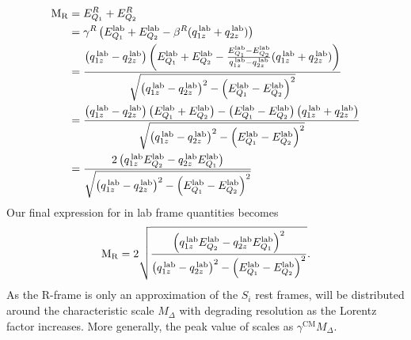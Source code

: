 \begin{align}
  \mathrm{M_R} &= E_{Q_1}^R + E_{Q_2}^R \\
      &= \gamma^R \left( E_{Q_1}^{\textrm{lab}} + E_{Q_2}^{\textrm{lab}} - \beta^R (
q_{1z}^{\,\textrm{lab}} + q_{2z}^{\,\textrm{lab}}) \right) \\
      &= \frac{\left( q_{1z}^{\,\textrm{lab}} - q_{2z}^{\,\textrm{lab}}\right) 
               \left( E_{Q_1}^{\textrm{lab}} + E_{Q_2}^{\textrm{lab}} - \frac{E_{Q_1}^{\textrm{lab}}
- E_{Q_2}^{\textrm{lab}}}{q_{1z}^{\,\textrm{lab}} - q_{2z}^{\,\textrm{lab}}}
(q_{1z}^{\,\textrm{lab}} + q_{2z}^{\,\textrm{lab}}) \right)}
              { \sqrt{ \left( q_{1z}^{\,\textrm{lab}} - q_{2z}^{\,\textrm{lab}} \right)^2 
                      -\left( E_{Q_1}^{\textrm{lab}} - E_{Q_2}^{\textrm{lab}}\right)^2 }} \\
      &= \frac{\left( q_{1z}^{\,\textrm{lab}} - q_{2z}^{\,\textrm{lab}} \right) 
               \left( E_{Q_1}^{\textrm{lab}} + E_{Q_2}^{\textrm{lab}} \right) 
               - 
               \left( E_{Q_1}^{\textrm{lab}} - E_{Q_2}^{\textrm{lab}} \right)
               \left( q_{1z}^{\,\textrm{lab}} + q_{2z}^{\,\textrm{lab}} \right) }
              { \sqrt{ \left( q_{1z}^{\,\textrm{lab}} - q_{2z}^{\,\textrm{lab}} \right)^2 
                      -\left( E_{Q_1}^{\textrm{lab}} - E_{Q_2}^{\textrm{lab}}\right)^2 }} \\
      &= \frac{2 \left( q_{1z}^{\,\textrm{lab}} E_{Q_2}^{\textrm{lab}} 
                       - q_{2z}^{\,\textrm{lab}} E_{Q_1}^{\textrm{lab}} \right)}
              { \sqrt{ \left( q_{1z}^{\,\textrm{lab}} - q_{2z}^{\,\textrm{lab}} \right)^2 
                      -\left( E_{Q_1}^{\textrm{lab}} - E_{Q_2}^{\textrm{lab}}\right)^2 }}
\end{align}
Our final expression for \mr in lab frame quantities becomes
\begin{equation}
  \mathrm{M_R} = 2 \sqrt { \frac{ \left( q_{1z}^{\,\textrm{lab}} E_{Q_2}^{\textrm{lab}} 
                       - q_{2z}^{\,\textrm{lab}} E_{Q_1}^{\textrm{lab}} \right) ^2}
                       { \left( q_{1z}^{\,\textrm{lab}} - q_{2z}^{\,\textrm{lab}} \right)^2 
                        -\left( E_{Q_1}^{\textrm{lab}} - E_{Q_2}^{\textrm{lab}}\right)^2 }} . 
\end{equation}
As the R-frame is only an approximation of the $S_i$ rest frames, \mr will be distributed around
the characteristic scale $M_\Delta$ with degrading resolution as the Lorentz factor increases. 
More generally, the peak value of \mr scales as $\gamma^{\textrm{CM}}M_\Delta$.

